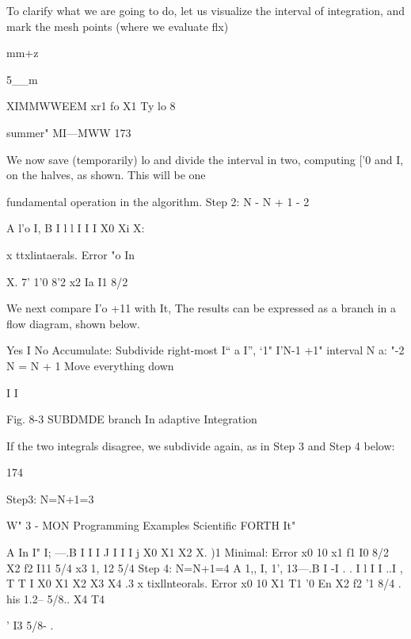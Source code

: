 {To clarify what we are going to do, let us visualize the interval of
integration, and mark the mesh points (where we evaluate ﬂx)

mm+z

5__m

XIMMWWEEM
xr1 fo
X1 Ty lo 8

summer" MI—MWW 173

We now save (temporarily) lo and divide the interval in two,
computing [’0 and I, on the halves, as shown. This will be one

fundamental operation in the algorithm.
Step 2: N - N + 1 - 2

 

 

 

A l'o I, B
I l l
I I I
X0 Xi X:

x ttxlintaerals. Error
"o In

X. 7' 1'0 8’2
x2 Ia I1 8/2

We next compare I’o +11 with It, The results can be expressed as
a branch in a ﬂow diagram, shown below.

 

 

 

 

 

Yes I No
Accumulate: Subdivide right-most
I“ a I”, ‘1" I’N-1 +1" interval
N a: "-2 N = N + 1
Move everything down

 

 

 

 

 

 

I I

 

 

 

Fig. 8-3 SUBDMDE branch In adaptive Integration

If the two integrals disagree, we subdivide again, as in Step 3 and
Step 4 below:

174

Step3: N=N+1=3

W" 3 - MON Programming Examples Scientiﬁc FORTH It"

 

 

 

 

 

 

 

 

 

 

 

A In I" I; —.B
I I I J
I I I j
X0 X1 X2 X.
)1 Minimal: Error
x0 10
x1 f1 I0 8/2
X2 f2 I11 5/4
x3 1, 12 5/4
Step 4: N=N+1=4
A 1,, I, 1', 13—.B
I -I . . I l I
I ..I , T T I
X0 X1 X2 X3 X4 .3
x tixllnteorals. Error
x0 10
X1 T1 '0 En
X2 f2 '1 8/4 .
his 1.2-- 5/8..
X4 T4} ' I3 5/8- .
